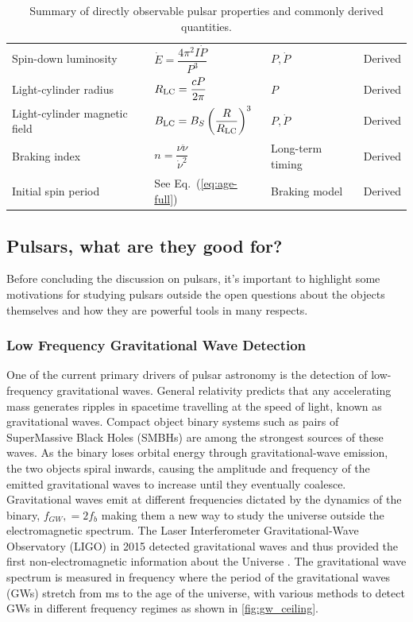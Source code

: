 \begin{table}[ht]
\begin{tabular}{llll}
Spin-down luminosity &
$\dot E=\dfrac{4\pi^2I\dot P}{P^3}$ &
$P,\dot P$ &
Derived \\

Light-cylinder radius &
$R_{\rm LC}=\dfrac{cP}{2\pi}$ &
$P$ &
Derived \\

Light-cylinder magnetic field &
$B_{\rm LC}=B_S\left(\dfrac{R}{R_{\rm LC}}\right)^3$ &
$P,\dot P$ &
Derived \\

Braking index &
$n=\dfrac{\nu\ddot{\nu}}{\dot{\nu}^2}$ &
Long-term timing &
Derived \\

Initial spin period &
See Eq.~(\ref{eq:age-full}) &
Braking model &
Derived \\

\hline
\end{tabular}
\caption{Summary of directly observable pulsar properties and commonly derived quantities.}
\label{tab:pulsar_observables}

\end{table}

\subsection{Pulsars, what are they good for?} \label{sec:pulsaruses}

Before concluding the discussion on pulsars, it's important to highlight some motivations for studying pulsars outside the open questions about the objects themselves and how they are powerful tools in many respects. 

\subsubsection{Low Frequency Gravitational Wave Detection}

One of the current primary drivers of pulsar astronomy is the detection of low-frequency gravitational waves. General relativity predicts that any accelerating mass generates ripples in spacetime travelling at the speed of light, known as gravitational waves. Compact object binary systems such as pairs of SuperMassive Black Holes (SMBHs) are among the strongest sources of these waves. As the binary loses orbital energy through gravitational-wave emission, the two objects spiral inwards, causing the amplitude and frequency of the emitted gravitational waves to increase until they eventually coalesce. Gravitational waves emit at different frequencies dictated by the dynamics of the binary, $f_{GW},=2f_b$ making them a new way to study the universe outside the electromagnetic spectrum. The Laser Interferometer Gravitational-Wave Observatory (LIGO) in 2015 detected gravitational waves and thus provided the first non-electromagnetic information about the Universe \citep{the_ligo_scientific_collaboration_and_the_virgo_collaboration_gw170817_2018}. The gravitational wave spectrum is measured in frequency where the period of the gravitational waves (GWs) stretch from ms to the age of the universe, with various methods to detect GWs in different frequency regimes as shown in \cref{fig:gw_ceiling}. 

